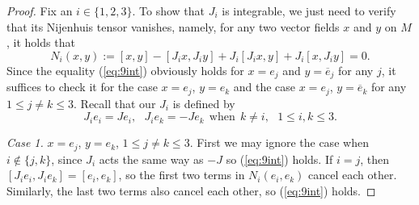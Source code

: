 \documentclass{amsart}
\numberwithin{equation}{section}
\theoremstyle{definition}
\renewcommand{\1}{\mathds{1}}
\renewcommand{\>}{\rightarrow}
\begin{document}
\begin{proof}
Fix an $i\in \{ 1,2,3\}$. To show that $J_i$ is integrable, we just need to verify that its Nijenhuis tensor vanishes, namely,  for any two vector fields $x$ and $y$ on $M$, it holds that
\begin{equation} \label{eq:9int}
 N_i(x,y):= [x,y] - [J_ix,J_iy] + J_i[J_ix,y] + J_i[x,J_iy] =0.
 \end{equation}
Since the equality (\ref{eq:9int}) obviously holds for $x=e_j$ and $y=\overline{e}_j$ for any $j$, it suffices to check it for the case $x=e_j$, $y=e_k$ and the case  $x=e_j$, $y=\overline{e}_k$ for any $1\leq j\neq k\leq 3$.  Recall that our $J_i$ is defined by
$$ J_ie_i=Je_i,\ \ \ J_ie_k =-Je_k \ \ \mbox{when} \ \ k\neq i, \ \ \ 1\leq i,k\leq 3. $$

{\em Case 1.} $x=e_j$, $y=e_k$, $1\leq j\neq  k\leq 3$. First we may ignore the case when $i\not\in \{ j,k\}$, since $J_i$ acts the same way as $-J$ so (\ref{eq:9int}) holds. If $i=j$, then $[J_ie_i,J_ie_k]=[e_i,e_k]$, so the first two terms in $N_i(e_i,e_k)$ cancel each other. Similarly, the last two terms also cancel each other, so (\ref{eq:9int}) holds.

\vspace{0.1cm}


\end{proof}
\end{document}
